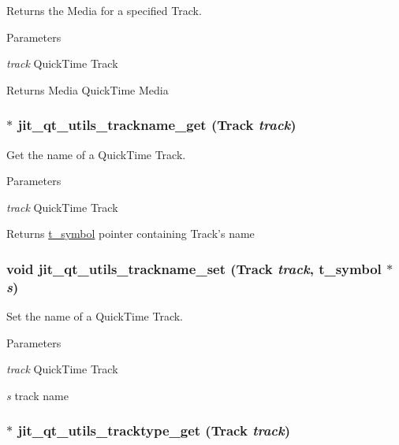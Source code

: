 Returns the Media for a specified Track. 
\begin{DoxyParams}{Parameters}
\item[{\em track}]QuickTime Track\end{DoxyParams}
\begin{DoxyReturn}{Returns}
Media QuickTime Media 
\end{DoxyReturn}
\hypertarget{group__qtutilsmod_gaf3dccb680fc0d7fff078079e21bc42e9}{
\subsubsection[{jit\_\-qt\_\-utils\_\-trackname\_\-get}]{$\ast$ jit\_\-qt\_\-utils\_\-trackname\_\-get (Track {\em track})}}
\label{group__qtutilsmod_gaf3dccb680fc0d7fff078079e21bc42e9}


Get the name of a QuickTime Track. 
\begin{DoxyParams}{Parameters}
\item[{\em track}]QuickTime Track\end{DoxyParams}
\begin{DoxyReturn}{Returns}
\hyperlink{structt__symbol}{t\_\-symbol} pointer containing Track's name 
\end{DoxyReturn}
\hypertarget{group__qtutilsmod_ga3ccc7712ee964822c546f6aded7adf05}{
\subsubsection[{jit\_\-qt\_\-utils\_\-trackname\_\-set}]{\setlength{\rightskip}{0pt plus 5cm}void jit\_\-qt\_\-utils\_\-trackname\_\-set (Track {\em track}, \/  {\bf t\_\-symbol} $\ast$ {\em s})}}
\label{group__qtutilsmod_ga3ccc7712ee964822c546f6aded7adf05}


Set the name of a QuickTime Track. 
\begin{DoxyParams}{Parameters}
\item[{\em track}]QuickTime Track \item[{\em s}]track name \end{DoxyParams}
\hypertarget{group__qtutilsmod_ga2672934be0a1a901c5b762e1c020e08b}{
\subsubsection[{jit\_\-qt\_\-utils\_\-tracktype\_\-get}]{$\ast$ jit\_\-qt\_\-utils\_\-tracktype\_\-get (Track {\em track})}}
\label{group__qtutilsmod_ga2672934be0a1a901c5b762e1c020e08b}


